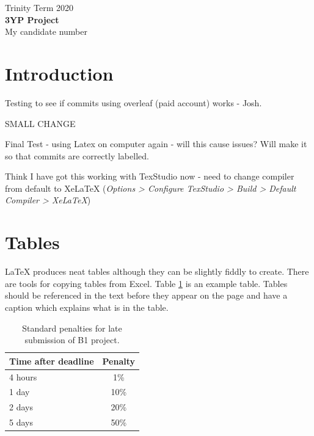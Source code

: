 \documentclass[11pt]{article}
\begin{document}
\begin{center}
\vspace*{2cm}
Trinity Term 2020\\ %
\vspace*{6cm}
 \huge{\textbf{{}3YP Project}}\\ 
\vspace*{6cm}
{\large{My candidate number}} %
\thispagestyle{empty} %


\end{center}

\newpage
\tableofcontents
\thispagestyle{empty} %
\newpage

\setcounter{page}{1}

\section{Introduction}
Testing to see if commits using overleaf (paid account) works - Josh.

SMALL CHANGE

Final Test - using Latex on computer again - will this cause issues? Will make it so that commits are correctly labelled.

Think I have got this working with TexStudio now - need to change compiler from default to XeLaTeX (\textit{Options > Configure TexStudio > Build > Default Compiler > XeLaTeX})




\section{Tables}

\LaTeX{} produces neat tables although they can be slightly fiddly to create. There are tools for copying tables from Excel. Table \ref{tab:latesubpen} is an example table. Tables should be referenced in the text before they appear on the page and have a caption which explains what is in the table.
\begin{table}[h] %
\begin{center}
\begin{tabular}{ |l|c| } 
 \hline
  Time after deadline & Penalty  \\ 
  \hline
 4 hours & 1\%  \\ 
 1 day & 10\%  \\ 
 2 days & 20\%  \\ 
 5 days & 50\%\\
 \hline
\end{tabular}
\end{center}
\label{tab:latesubpen}
\caption{Standard penalties for late submission of B1 project.}
\end{table}
\end{document}
